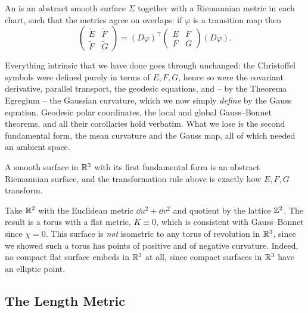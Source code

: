 \documentclass[a4paper]{scrartcl}
\begin{document}
\begin{definition}
    An  is an abstract smooth surface $\Sigma$ together with a Riemannian metric in each chart, such that the metrics agree on overlaps: if $\varphi$ is a transition map then
    $$
    \begin{pmatrix} \tilde E & \tilde F \\ \tilde F & \tilde G\end{pmatrix} = \left(D\varphi\right)^\top \begin{pmatrix} E & F \\ F & G \end{pmatrix} \left(D\varphi\right).
    $$
\end{definition}

Everything intrinsic that we have done goes through unchanged: the Christoffel symbols were defined purely in terms of $E, F, G$, hence so were the covariant derivative, parallel transport, the geodesic equations, and -- by the Theorema Egregium -- the Gaussian curvature, which we now simply \emph{define} by the Gauss equation. Geodesic polar coordinates, the local and global Gauss--Bonnet theorems, and all their corollaries hold verbatim. What we lose is the second fundamental form, the mean curvature and the Gauss map, all of which needed an ambient space.

\begin{example}[Surfaces in $\R^3$]
    A smooth surface in $\R^3$ with its first fundamental form is an abstract Riemannian surface, and the transformation rule above is exactly how $E, F, G$ transform.
\end{example}

\begin{example}
    Take $\mathbb{R}^2$ with the Euclidean metric $\dd u^2 + \dd v^2$ and quotient by the lattice $\mathbb{Z}^2$. The result is a torus with a flat metric, $K \equiv 0$, which is consistent with Gauss--Bonnet since $\chi = 0$. This surface is \emph{not} isometric to any torus of revolution in $\R^3$, since we showed such a torus has points of positive and of negative curvature. Indeed, no compact flat surface embeds in $\R^3$ at all, since compact surfaces in $\R^3$ have an elliptic point.
\end{example}

\subsection{The Length Metric}
\end{document}
